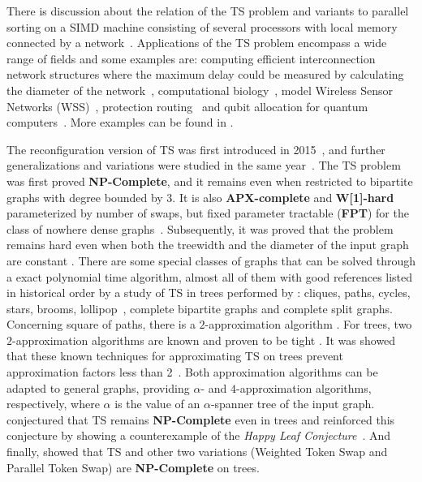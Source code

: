 \documentclass[msc,english,table,xcdraw]{ppgccufmg}
\begin{document}

There is discussion about the relation of the TS problem and variants 
to parallel sorting on a SIMD machine consisting of several processors with
local memory connected by a network~\citep{Yamanaka:2015,Kawahara:2017}. 
Applications of the TS problem encompass a wide range of fields and some 
examples are: computing efficient interconnection network structures where the 
maximum delay could be measured by calculating the diameter of the 
network~\citep{Annexstein:1990}, computational biology~\citep
{Bafna:1998,Lenwood:2003}, model Wireless Sensor Networks (WSS)~\citep
{Wang:2007}, protection routing~\citep{Pai:2020} and qubit allocation for 
quantum computers~\citep{Siraichi:2018,Siraichi:2019}.
More examples can be found in \cite{Oswin:2021}.

The reconfiguration version of TS was first introduced in 2015~\citep{
Yamanaka:2015}, and further generalizations and variations were studied in the 
same year~\citep{Yamanaka:Colored:2015}.
The TS problem was first proved \textbf{NP-Complete}, and it remains 
even when restricted to bipartite graphs with degree bounded by 3. 
It is also \textbf{APX-complete} and \textbf{W[1]-hard} parameterized by number of swaps, 
but fixed parameter tractable (\textbf{FPT}) for the class of nowhere dense
graphs~\citep{Kawahara:2017,Miltzow:2016}.
Subsequently, it was proved that the problem remains hard even when both the 
treewidth and the diameter of the input graph are constant \citep{Bonnet:2018}.
There are some special classes of graphs that can be solved through a
exact polynomial time algorithm, almost all of them with good references 
listed in historical order by a study of TS in trees performed by 
\citep{Ahmad:2019}: cliques, paths, cycles, stars, brooms, 
lollipop~\citep{Kawahara:2017}, complete bipartite graphs and complete split 
graphs.
Concerning square of paths, there is a $2$-approximation algorithm 
\citep{Lenwood:2003}.
For trees, two $2$-approximation algorithms \citep{Yamanaka:2015,Miltzow:2016} 
are known and proven to be tight \citep{Ahmad:2019}.
It was showed that these known techniques for approximating TS on trees
prevent approximation factors less than 2~\citep{Oswin:2021}.
Both approximation algorithms can be adapted to general graphs, providing 
$\alpha$- and $4$-approximation algorithms, respectively, where $\alpha$ is the 
value of an $\alpha$-spanner tree of the input graph.
\cite{Bonnet:2018} conjectured that TS remains \textbf{NP-Complete}
even in trees and \cite{Ahmad:2019} reinforced this conjecture by showing a 
counterexample of the \textit{Happy Leaf Conjecture}~\citep{Vaughan:1991}.
And finally, \cite{Oswin:2021} showed that TS and other two variations (Weighted 
Token Swap and Parallel Token Swap) are \textbf{NP-Complete} on trees.
\end{document}
